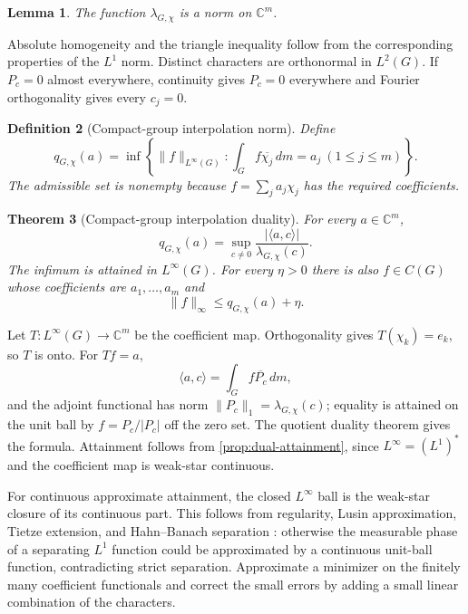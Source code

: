 \documentclass[12pt,a4paper,twoside]{extarticle}
\makeatletter
\theoremstyle{compactplain}
\newtheorem{theorem}{Theorem}[section]
\newtheorem{lemma}[theorem]{Lemma}
\theoremstyle{compactdef}
\newtheorem{definition}[theorem]{Definition}
\renewenvironment{proof}[1][\proofname]{\par\pushQED{\qed}\normalfont
  \topsep2pt\trivlist\item[\hskip\labelsep\bfseries #1\@addpunct{.}]\ignorespaces}
 {\popQED\endtrivlist\@endpefalse}
\makeatother
\begin{document}
\begin{lemma}
The function $\lambda_{G,\chi}$ is a norm on $\mathbb C^m$.
\end{lemma}
\begin{proof}
Absolute homogeneity and the triangle inequality follow from the corresponding properties of the $L^1$ norm.  Distinct characters are orthonormal in $L^2(G)$.  If $P_c=0$ almost everywhere, continuity gives $P_c=0$ everywhere and Fourier orthogonality gives every $c_j=0$.
\end{proof}

\begin{definition}[Compact-group interpolation norm]
Define
\[
 q_{G,\chi}(a)=\inf\left\{\|f\|_{L^\infty(G)}:
 \int_G f\overline{\chi_j}\,dm=a_j\ (1\le j\le m)\right\}.
\]
The admissible set is nonempty because $f=\sum_ja_j\chi_j$ has the required coefficients.
\end{definition}

\begin{theorem}[Compact-group interpolation duality]\label{thm:compact-duality}
For every $a\in\mathbb C^m$,
\[
 q_{G,\chi}(a)=\sup_{c\ne0}
 \frac{|\langle a,c\rangle|}{\lambda_{G,\chi}(c)}.
\]
The infimum is attained in $L^\infty(G)$.  For every $\eta>0$ there is also $f\in C(G)$ whose coefficients are $a_1,\dots,a_m$ and
\[
 \|f\|_\infty\le q_{G,\chi}(a)+\eta.
\]
\end{theorem}
\begin{proof}
Let $T:L^\infty(G)\to\mathbb C^m$ be the coefficient map.  Orthogonality gives $T(\chi_k)=e_k$, so $T$ is onto.  For $Tf=a$,
\[
 \langle a,c\rangle=\int_G f\overline{P_c}\,dm,
\]
and the adjoint functional has norm $\|P_c\|_1=\lambda_{G,\chi}(c)$; equality is attained on the unit ball by $f=P_c/|P_c|$ off the zero set.  The quotient duality theorem gives the formula.  Attainment follows from \cref{prop:dual-attainment}, since $L^\infty=(L^1)^*$ and the coefficient map is weak-star continuous.

For continuous approximate attainment, the closed $L^\infty$ ball is the weak-star closure of its continuous part.  This follows from regularity, Lusin approximation, Tietze extension, and Hahn--Banach separation \cite{conway,folland}: otherwise the measurable phase of a separating $L^1$ function could be approximated by a continuous unit-ball function, contradicting strict separation.  Approximate a minimizer on the finitely many coefficient functionals and correct the small errors by adding a small linear combination of the characters.
\end{proof}
\end{document}
